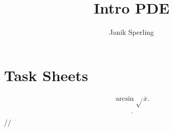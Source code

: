 \documentclass[a4paper]{report}
\title{Intro PDE}
\author{Janik Sperling}
\begin{document}



\chapter{Task Sheets}
% 

\begin{align*}
  \arcsin \sqrt{} 
  \hat{} 
  \dot{} 
  \overline{x}
.\end{align*}
\begin{align*}
  \frac{}{}
.\end{align*}
//
\end{document}
